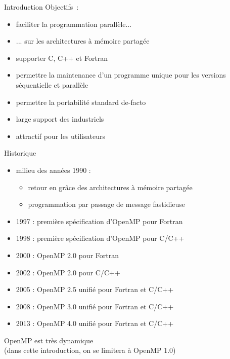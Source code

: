 %
%

\def\inc{inc8-openmp}




\begin {frame} {Introduction}
    Objectifs~:
    
    \begin {itemize}
	\item faciliter la programmation parallèle...
	\item ...  sur les architectures à mémoire partagée
	\item supporter C, C++ et Fortran
	\item permettre la maintenance d'un programme unique pour
	    les versions séquentielle et parallèle
	\item permettre la portabilité \implique standard de-facto
	\item large support des industriels
	\item attractif pour les utilisateurs
    \end {itemize}

\end {frame}

\begin {frame} {Historique}

    \begin {itemize}
	\item milieu des années 1990 :
	    \begin {itemize}
		\item retour en grâce des architectures à mémoire partagée
		\item programmation par passage de message fastidieuse
	    \end {itemize}
	\item 1997 : première spécification d'OpenMP pour Fortran
	\item 1998 : première spécification d'OpenMP pour C/C++
	\item 2000 : OpenMP 2.0 pour Fortran
	\item 2002 : OpenMP 2.0 pour C/C++
	\item 2005 : OpenMP 2.5 unifié pour Fortran et C/C++
	\item 2008 : OpenMP 3.0 unifié pour Fortran et C/C++
	\item 2013 : OpenMP 4.0 unifié pour Fortran et C/C++
    \end {itemize}

    \implique OpenMP est très dynamique \\
    (dans cette introduction, on se limitera à OpenMP 1.0)

\end {frame}

